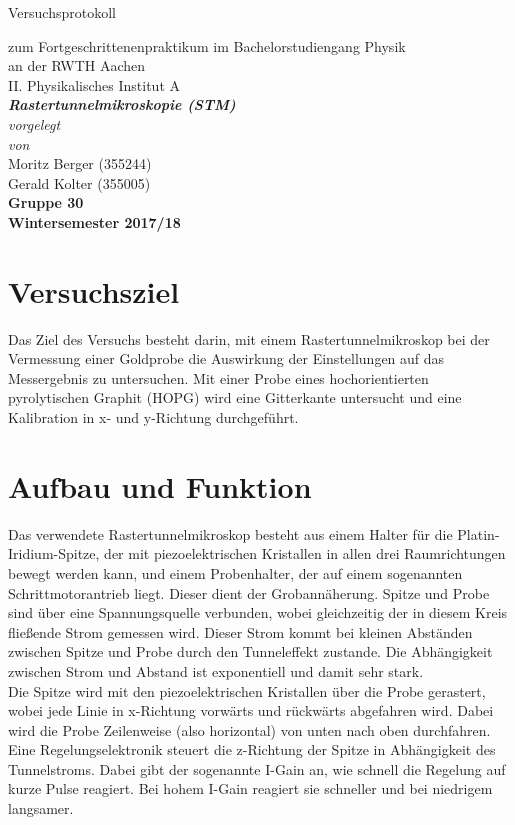 \documentclass[12pt,a4paper]{article}
\author{Gerald}
\begin{document}
	\setlength{\parindent}{0pt} 
	\begin{center}
		{\LARGE Versuchsprotokoll}\\
		\begin{large}
			zum Fortgeschrittenenpraktikum im Bachelorstudiengang Physik\\[0.4cm]
			an der RWTH Aachen\\
			II. Physikalisches Institut A\\[5.5cm]
			\Large\textbf{\textsl{Rastertunnelmikroskopie (STM)}}\\[5.5cm]
			\normalsize\textit{vorgelegt\\von}\\[0.4cm]
			\large{Moritz Berger (355244)\\Gerald Kolter (355005)}\\\textbf{Gruppe 30}\\[2cm]
			\large \textbf{Wintersemester 2017/18}
		\end{large}
	\end{center}
	\newpage
	
	\tableofcontents
	\newpage

\section{Versuchsziel}
Das Ziel des Versuchs besteht darin, mit einem Rastertunnelmikroskop bei der Vermessung einer Goldprobe die Auswirkung der Einstellungen auf das Messergebnis zu untersuchen. Mit einer Probe eines hochorientierten pyrolytischen Graphit (HOPG) wird eine Gitterkante untersucht und eine Kalibration in x- und y-Richtung durchgeführt.

\section{Aufbau und Funktion}
Das verwendete Rastertunnelmikroskop besteht aus einem Halter für die Platin-Iridium-Spitze, der mit piezoelektrischen Kristallen in allen drei Raumrichtungen bewegt werden kann, und einem Probenhalter, der auf einem sogenannten Schrittmotorantrieb liegt. Dieser dient der Grobannäherung. Spitze und Probe sind über eine Spannungsquelle verbunden, wobei gleichzeitig der in diesem Kreis fließende Strom gemessen wird. Dieser Strom kommt bei kleinen Abständen zwischen Spitze und Probe durch den Tunneleffekt zustande. Die Abhängigkeit zwischen Strom und Abstand ist exponentiell und damit sehr stark.\\
Die Spitze wird mit den piezoelektrischen Kristallen über die Probe gerastert, wobei jede Linie in x-Richtung vorwärts und rückwärts abgefahren wird. Dabei wird die Probe Zeilenweise (also horizontal) von unten nach oben durchfahren.
Eine Regelungselektronik steuert die z-Richtung der Spitze in Abhängigkeit des Tunnelstroms. Dabei gibt der sogenannte I-Gain an, wie schnell die Regelung auf kurze Pulse reagiert. Bei hohem I-Gain reagiert sie schneller und bei niedrigem langsamer.
\end{document}
